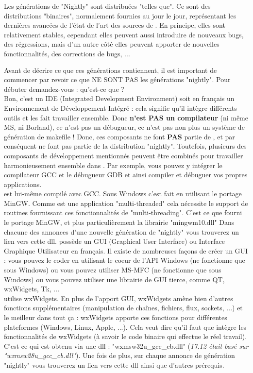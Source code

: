 Les générations de "Nightly" sont distribuées "telles que". Ce sont des distributions "binaires", normalement fournies au jour le jour, représentant les dernières avancées de l'état de l'art des sources de \codeblocks. En principe, elles sont relativement stables, cependant elles peuvent aussi introduire de nouveaux bugs, des régressions, mais d'un autre côté elles peuvent apporter de nouvelles fonctionnalités, des corrections de bugs, ...

Avant de décrire ce que ces générations contiennent, il est important de commencer par revoir ce que NE SONT PAS les générations "nightly". Pour débuter demandez-vous : qu'est-ce que \codeblocks ?\\
Bon, c'est un IDE (Integrated Development Environment) soit en français un Environnement de Développement Intégré : cela signifie qu'il intègre différents outils et les fait travailler ensemble. Donc \codeblocks \textbf{n'est PAS un compilateur} (ni même MS, ni Borland), ce n'est pas un débugueur, ce n'est pas non plus un système de génération de makefile ! Donc, ces composants ne font \textbf{PAS} partie de \codeblocks, et par conséquent ne font pas partie de la distribution "nightly". Toutefois, plusieurs des composants de développement mentionnés peuvent être combinés pour travailler harmonieusement ensemble dans \codeblocks. Par exemple, vous pouvez y intégrer le compilateur GCC et le débugueur GDB et ainsi compiler et débuguer vos propres applications.\\
\codeblocks est lui-même compilé avec GCC. Sous Windows c'est fait en utilisant le portage MinGW. Comme \codeblocks est une application "multi-threaded" cela nécessite le support de routines fournissant ces fonctionnalités de "multi-threading". C'est ce que fourni le portage MinGW, et plus particulièrement la librairie "mingwm10.dll" Dans chacune des annonces d'une nouvelle génération de "nightly" vous trouverez un lien vers cette dll.
\codeblocks possède un GUI (Graphical User Interface) ou Interface Graphique Utilisateur en français. Il existe de nombreuses façons de créer un GUI : vous pouvez le coder en utilisant le coeur de l'API Windows (ne fonctionne que sous Windows) ou vous pouvez utiliser MS-MFC (ne fonctionne que sous Windows) ou vous pouvez utiliser une librairie de GUI tierce, comme QT, wxWidgets, Tk, ...\\
\codeblocks utilise wxWidgets. En plus de l'apport GUI, wxWidgets amène bien d'autres fonctions supplémentaires (manipulation de chaînes, fichiers, flux, sockets, ...) et le meilleur dans tout ça : wxWidgets apporte ces fonctions pour différentes plateformes (Windows, Linux, Apple, ...). Cela veut dire qu'il faut que \codeblocks intègre les fonctionnalités de wxWidgets (à savoir le code binaire qui effectue le réel travail). C'est ce qui est obtenu via une dll : "wxmsw32u\_gcc\_cb.dll" (\textit{17.12 était basé sur "wxmsw28u\_gcc\_cb.dll"}). Une fois de plus, sur chaque annonce de génération "nightly" vous trouverez un lien vers cette dll ainsi que d'autres prérequis.

